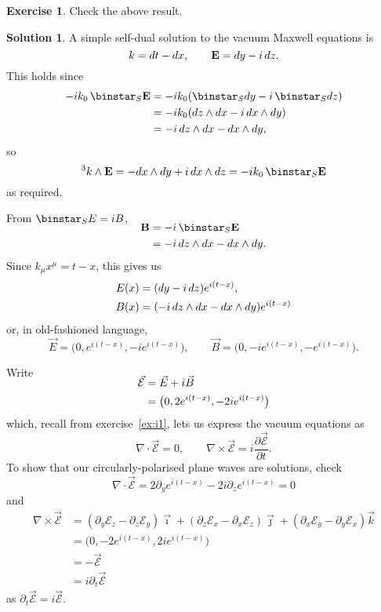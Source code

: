 \documentclass[11pt, a4paper]{report}
\theoremstyle{definition}
\newtheorem{exercise}{Exercise}[part]
\newtheorem{solution}{Solution}[part]
\newenvironment{ex}{\begin{exercise}}{\end{exercise}\pagebreak[1]}
\newenvironment{sol}{\begin{solution}}{\end{solution}\pagebreak[3]}
\newcommand*{\op}[1]{\ensuremath\mathop{}\mathopen{}#1}
\renewcommand*{\d}{\op{d}}
\renewcommand*{\star}{\op{\binstar}\mathord{}}
\begin{document}
\begin{ex}

Check the above result.

\end{ex}

\begin{sol}

A simple self-dual solution to the vacuum Maxwell equations is
\[
    k = dt - dx, \qquad \mathbf{E} = dy - i \d z.
\]
This holds since
\begin{align*}
    -i k_0 \star_S \mathbf{E} &= -i k_0 (\star_S dy - i \star_S dz) \\
    &= -i k_0 (dz \wedge dx - i \d x \wedge dy) \\
    &= -i \d z \wedge dx - dx \wedge dy,
\end{align*}
so
\[
    ^3 k \wedge \mathbf{E} = -dx \wedge dy + i \d x \wedge dz = -ik_0 \star_S \mathbf{E}
\]
as required.

From $\star_S E = iB$,
\begin{align*}
    \SwapAboveDisplaySkip
    \mathbf{B} &= -i \star_S \mathbf{E} \\
               &= -i \d z \wedge dx - dx \wedge dy.
\end{align*}
Since $k_\mu x^\mu = t - x$, this gives us
\begin{align*}
    E(x) &= (dy - i \d z) e^{i (t - x)}, \\
    B(x) &= (-i \d z \wedge dx - dx \wedge dy) e^{i (t - x)}
\end{align*}
or, in old-fashioned language,
\[
    \vec{E} = \bigl( 0, e^{i(t - x)}, -ie^{i(t - x)} \bigr), \qquad
    \vec{B} = \bigl( 0, -i e^{i(t - x)}, -e^{i(t - x)} \bigr).
\]

Write
\begin{align*}
    \SwapAboveDisplaySkip
    \vec{\mathcal{E}} &= \vec{E} + i \vec{B} \\
                      &= \bigl( 0, 2 e^{i(t - x)}, -2 i e^{i(t - x)} \bigr)
\end{align*}
which, recall from exercise~\ref{ex:i1}, lets us express the vacuum equations as
\[
    \nabla \cdot \vec{\mathcal{E}} = 0, \qquad
    \nabla \times \vec{\mathcal{E}} = i \frac{\partial \vec{\mathcal{E}}}{\partial t}.
\]
To show that our circularly-polarised plane waves are solutions, check
\[
    \nabla \cdot \vec{\mathcal{E}} = 2 \partial_y e^{i(t - x)}
                                      -2 i \partial_z e^{i(t - x)}
                                   = 0
\]
and
\begin{align*}
    \nabla \times \vec{\mathcal{E}} &= (\partial_y \mathcal{E}_z - \partial_z \mathcal{E}_y) \vec{\imath}
            + (\partial_z \mathcal{E}_x - \partial_x \mathcal{E}_z) \vec{\jmath}
            + (\partial_x \mathcal{E}_y - \partial_y \mathcal{E}_x) \vec{k} \\
        &= \bigl( 0, -2 e^{i(t - x)}, 2 i e^{i(t - x)} \bigr) \\
        &= - \vec{\mathcal{E}} \\
        &= i \partial_t \vec{\mathcal{E}}
\end{align*}
as $\partial_t \vec{\mathcal{E}} = i \vec{\mathcal{E}}$.

\end{sol}
\end{document}
